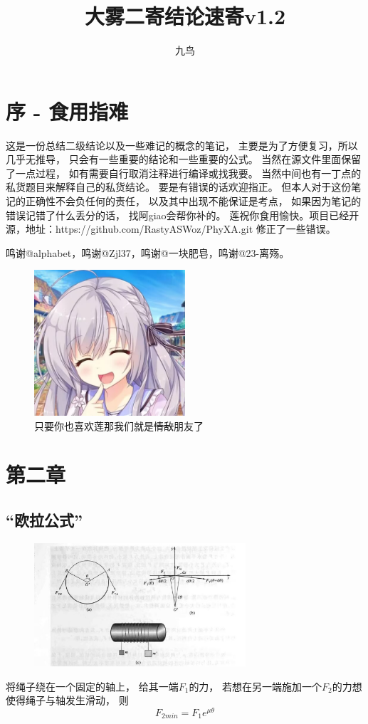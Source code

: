 \documentclass{ctexart}
\author{九鸟}
\title{大雾二寄结论速寄v1.2}
\date{}
\begin{document}
\maketitle
\section{序 - 食用指难}
这是一份总结二级结论以及一些难记的概念的笔记，
主要是为了方便复习，所以几乎无推导，
只会有一些重要的结论和一些重要的公式。
当然在源文件里面保留了一点过程，
如有需要自行取消注释进行编译或找我要。
当然中间也有一丁点的私货题目来解释自己的私货结论。
要是有错误的话欢迎指正。
但本人对于这份笔记的正确性不会负任何的责任，
以及其中出现不能保证是考点，
如果因为笔记的错误记错了什么丢分的话，
找阿giao会帮你补的。
莲祝你食用愉快。项目已经开源，地址：https://github.com/RastyASWoz/PhyXA.git
修正了一些错误。


鸣谢@alphabet，鸣谢@Zjl37，鸣谢@一块肥皂，鸣谢@23-离殇。
\begin{figure}[H]
    \centering
    \includegraphics[width=0.5\textwidth]{img/lian.jpg}
    \caption[ ]{只要你也喜欢莲那我们就是\sout{情敌}朋友了}
\end{figure}
\section{第二章}
\subsection{“欧拉公式”}
\begin{figure}[H]
    \centering
    \includegraphics[width=0.7\textwidth]{img/ola.jpg}
\end{figure}
将绳子绕在一个固定的轴上，
给其一端$F_1$的力，
若想在另一端施加一个$F_2$的力想使得绳子与轴发生滑动，
则
$$
    F_{2min} = F_1 e^{\mu \theta}
$$
\end{document}
